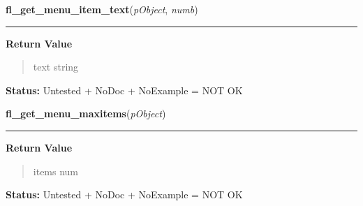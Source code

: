     \label{xformslib:library:fl_get_menu_item_text}

    \vspace{0.5ex}

\hspace{.8\funcindent}\begin{boxedminipage}{\funcwidth}

    \raggedright \textbf{fl\_get\_menu\_item\_text}(\textit{pObject}, \textit{numb})

    \vspace{-1.5ex}

    \rule{\textwidth}{0.5\fboxrule}
\setlength{\parskip}{2ex}
\setlength{\parskip}{1ex}
      \textbf{Return Value}
    \vspace{-1ex}

      \begin{quote}
      text string

      \end{quote}

\textbf{Status:} Untested + NoDoc + NoExample = NOT OK



    \end{boxedminipage}

    \label{xformslib:library:fl_get_menu_maxitems}

    \vspace{0.5ex}

\hspace{.8\funcindent}\begin{boxedminipage}{\funcwidth}

    \raggedright \textbf{fl\_get\_menu\_maxitems}(\textit{pObject})

    \vspace{-1.5ex}

    \rule{\textwidth}{0.5\fboxrule}
\setlength{\parskip}{2ex}
\setlength{\parskip}{1ex}
      \textbf{Return Value}
    \vspace{-1ex}

      \begin{quote}
      items num

      \end{quote}

\textbf{Status:} Untested + NoDoc + NoExample = NOT OK



    \end{boxedminipage}


